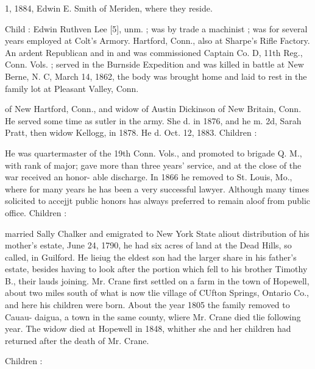 \documentclass[oneside]{book}
\begin{document}
1, 1884, Edwin E. Smith of Meriden, where they reside. 

Child : 
Edwin Ruthven Lee [5], unm. ; was by trade a machinist ; was 
for several years employed at Colt's Armory. Hartford, Conn., 
also at Sharpe's Rifle Factory. An ardent Republican and in 
and was commissioned Captain Co. D, 11th Reg., Conn. Vols. ; 
served in the Burnside Expedition and was killed in battle at 
New Berne, N. C, March 14, 1862, the body was brought 
home and laid to rest in the family lot at Pleasant Valley, Conn. 


of New Hartford, Conn., and widow of Austin Dickinson of 
New Britain, Conn. He served some time as sutler in the 
army. She d. in 1876, and he m. 2d, Sarah Pratt, then 
widow Kellogg, in 1878. He d. Oct. 12, 1883. Children : 





He was quartermaster of the 19th Conn. Vols., and promoted 
to brigade Q. M., with rank of major; gave more than three 
years' service, and at the close of the war received an honor- 
able discharge. In 1866 he removed to St. Louis, Mo., where 
for many years he has been a very successful lawyer. 
Although many times solicited to accejjt public honors has 
always preferred to remain aloof from public office. Children : 






married Sally Chalker and emigrated to New York State aliout 
distribution of his mother's estate, June 24, 1790, he had six 
acres of land at the Dead Hills, so called, in Guilford. He lieiug 
the eldest son had the larger share in his father's estate, besides 
having to look after the portion which fell to his brother Timothy 
B., their lauds joining. Mr. Crane first settled on a farm in the 
town of Hopewell, about two miles south of what is now tlie 
village of CUfton Springs, Ontario Co., and here his children 
were born. About the year 1805 the family removed to Cauau- 
daigua, a town in the same county, wliere Mr. Crane died tlie 
following year. The widow died at Hopewell in 1848, whither 
she and her children had returned after the death of Mr. Crane. 

Children : 
\end{document}
